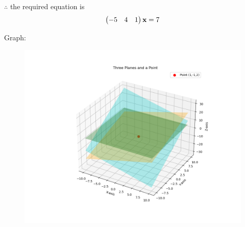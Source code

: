 \documentclass{beamer}
\numberwithin{equation}{section}
\begin{document}
$\therefore$ the required equation is
\begin{align}
		\begin{pmatrix}-5&4&1\end{pmatrix}\mathbf{x} = 7
\end{align}
		

Graph:
\begin{figure}[H]
    \centering
    \includegraphics[scale=0.5]{plot}
    \caption{}
    \label{fig:plot}
\end{figure}
\end{document}
